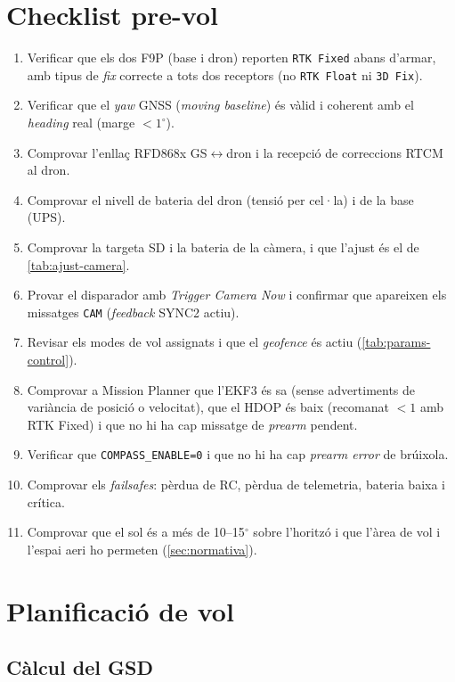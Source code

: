 \section{Checklist pre-vol}
\label{sec:checklist-prevol}

\begin{enumerate}[label=\arabic*.]
    \item Verificar que els dos F9P (base i dron) reporten \texttt{RTK Fixed} abans d'armar, amb tipus de \emph{fix} correcte a tots dos receptors (no \texttt{RTK Float} ni \texttt{3D Fix}).
    \item Verificar que el \emph{yaw} GNSS (\emph{moving baseline}) és vàlid i coherent amb el \emph{heading} real (marge $< 1^{\circ}$).
    \item Comprovar l'enllaç RFD868x GS$\leftrightarrow$dron i la recepció de correccions RTCM al dron.
    \item Comprovar el nivell de bateria del dron (tensió per cel·la) i de la base (UPS).
    \item Comprovar la targeta SD i la bateria de la càmera, i que l'ajust és el de \cref{tab:ajust-camera}.
    \item Provar el disparador amb \emph{Trigger Camera Now} i confirmar que apareixen els missatges \texttt{CAM} (\emph{feedback} SYNC2 actiu).
    \item Revisar els modes de vol assignats i que el \emph{geofence} és actiu (\cref{tab:params-control}).
    \item Comprovar a Mission Planner que l'EKF3 és sa (sense advertiments de variància de posició o velocitat), que el HDOP és baix (recomanat $< 1$ amb RTK Fixed) i que no hi ha cap missatge de \emph{prearm} pendent.
    \item Verificar que \texttt{COMPASS\_ENABLE=0} i que no hi ha cap \emph{prearm error} de brúixola.
    \item Comprovar els \emph{failsafes}: pèrdua de RC, pèrdua de telemetria, bateria baixa i crítica.
    \item Comprovar que el sol és a més de 10--15$^{\circ}$ sobre l'horitzó i que l'àrea de vol i l'espai aeri ho permeten (\cref{sec:normativa}).
\end{enumerate}

\section{Planificació de vol}
\label{sec:planificacio-vol}

\subsection{Càlcul del GSD}

